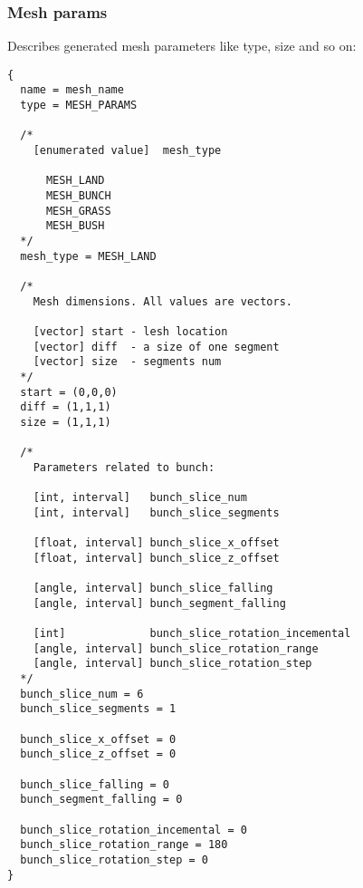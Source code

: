\documentclass[9pt]{article}
\begin{document}
\subsubsection{Mesh params}
Describes generated mesh parameters like type, size and so on:
\begin{verbatim}
{
  name = mesh_name
  type = MESH_PARAMS

  /*
    [enumerated value]  mesh_type
   
      MESH_LAND
      MESH_BUNCH
      MESH_GRASS
      MESH_BUSH
  */
  mesh_type = MESH_LAND
  
  /*
    Mesh dimensions. All values are vectors.
  
    [vector] start - lesh location 
    [vector] diff  - a size of one segment 
    [vector] size  - segments num
  */  
  start = (0,0,0)
  diff = (1,1,1)
  size = (1,1,1)
  
  /*
    Parameters related to bunch:
    
    [int, interval]   bunch_slice_num
    [int, interval]   bunch_slice_segments
      
    [float, interval] bunch_slice_x_offset
    [float, interval] bunch_slice_z_offset
      
    [angle, interval] bunch_slice_falling
    [angle, interval] bunch_segment_falling
        
    [int]             bunch_slice_rotation_incemental
    [angle, interval] bunch_slice_rotation_range
    [angle, interval] bunch_slice_rotation_step
  */    
  bunch_slice_num = 6
  bunch_slice_segments = 1
  
  bunch_slice_x_offset = 0
  bunch_slice_z_offset = 0
  
  bunch_slice_falling = 0
  bunch_segment_falling = 0
  
  bunch_slice_rotation_incemental = 0
  bunch_slice_rotation_range = 180
  bunch_slice_rotation_step = 0
}
\end{verbatim}
\end{document}

